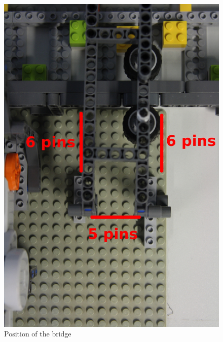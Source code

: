 \documentclass[%
  a4paper,%
  11pt,%
  blue,%
  hyperref	%
  ]{tubsartcl}
\begin{document}
\begin{figure}[!htb]
\begin{center}
\includegraphics[scale=0.4]{graphics/bridge1.jpg}
\end{center}
\caption{Position of the bridge}
\end{figure}
\end{document}
